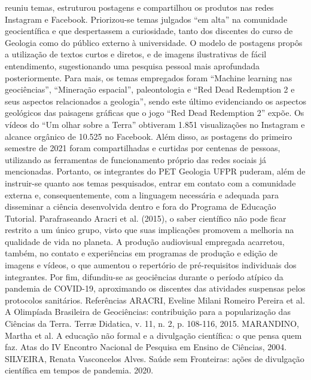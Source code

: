 reuniu temas, estruturou postagens e compartilhou os produtos nas redes Instagram e Facebook.
Priorizou-se temas julgados “em alta” na comunidade geocientífica e que despertassem a
curiosidade, tanto dos discentes do curso de Geologia como do público externo à universidade. O
modelo de postagens propôs a utilização de textos curtos e diretos, e de imagens ilustrativas de
fácil entendimento, sugestionando uma pesquisa pessoal mais aprofundada posteriormente. Para
mais, os temas empregados foram “Machine learning nas geociências”, “Mineração espacial”,
paleontologia e “Red Dead Redemption 2 e seus aspectos relacionados a geologia”, sendo este
último evidenciando os aspectos geológicos das paisagens gráficas que o jogo “Red Dead
Redemption 2” expõe. Os vídeos do “Um olhar sobre a Terra” obtiveram 1.851 visualizações no
Instagram e alcance orgânico de 10.525 no Facebook. Além disso, as postagens do primeiro
semestre de 2021 foram compartilhadas e curtidas por centenas de pessoas, utilizando as
ferramentas de funcionamento próprio das redes sociais já mencionadas. Portanto, os integrantes
do PET Geologia UFPR puderam, além de instruir-se quanto aos temas pesquisados, entrar em
contato com a comunidade externa e, consequentemente, com a linguagem necessária e
adequada para disseminar a ciência desenvolvida dentro e fora do Programa de Educação
Tutorial. Parafraseando Aracri et al. (2015), o saber científico não pode ficar restrito a um único
grupo, visto que suas implicações promovem a melhoria na qualidade de vida no planeta. A
produção audiovisual empregada acarretou, também, no contato e experiências em programas de
produção e edição de imagens e vídeos, o que aumentou o repertório de pré-requisitos
individuais dos integrantes. Por fim, difundiu-se as geociências durante o período atípico da
pandemia de COVID-19, aproximando os discentes das atividades suspensas pelos protocolos
sanitários.
Referências
ARACRI, Eveline Milani Romeiro Pereira et al. A Olimpíada Brasileira de Geociências:
contribuição para a popularização das Ciências da Terra. Terræ Didatica, v. 11, n. 2, p. 108-116,
2015.
MARANDINO, Martha et al. A educação não formal e a divulgação científica: o que pensa
quem faz. Atas do IV Encontro Nacional de Pesquisa em Ensino de Ciências, 2004.
SILVEIRA, Renata Vasconcelos Alves. Saúde sem Fronteiras: ações de divulgação científica
em tempos de pandemia. 2020.




